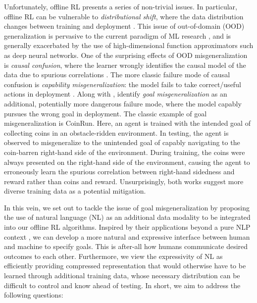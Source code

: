 \documentclass[../thesis-proposal/main.tex]{subfiles}
\begin{document}
Unfortunately, offline RL presents a series of non-trivial issues. In particular, offline RL can be
vulnerable to \textit{distributional shift}, where the data distribution changes between training
and deployment \citep{quinonero-candela_dataset_2008}. This issue of out-of-domain (OOD)
generalization \citep{shen_towards_2021} is pervasive to the current paradigm of ML research
\citep{arjovsky_out_2020}, and is generally exacerbated by the use of high-dimensional function
approximators such as deep neural networks. One of the surprising effects of OOD misgeneralization
is \textit{causal confusion}, where the learner wrongly identifies the causal model of the data due
to spurious correlations \citep{de_haan_causal_2019}. The more classic  failure mode of causal
confusion is \textit{capability misgeneralization}: the model fails to take correct/useful actions
in deployment \citep{gupta_can_2022, tien_study_2022}. Along with \citet{shah_goal_2022},
\citet{langosco_goal_2022} identify \textit{goal misgeneralization} as an additional, potentially
more dangerous failure mode, where the model capably pursues the wrong goal in deployment. The
classic example of goal misgeneralization is CoinRun. Here, an agent is trained with the intended
goal of collecting coins in an obstacle-ridden environment. In testing, the agent is observed to
misgeneralize to the unintended goal of capably navigating to the coin-barren right-hand side of the
environment. During training, the coins were always presented on the right-hand side of the
environment, causing the agent to erroneously learn the spurious correlation between right-hand
sidedness and reward rather than coins and reward. Unsurprisingly, both works suggest more diverse
training data as a potential mitigation.

In this vein, we set out to tackle the issue of goal misgeneralization by proposing the use of
natural language (NL) as an additional data modality to be integrated into our offline RL
algorithms. Inspired by their applications beyond a pure NLP context \citep{dosovitskiy_image_2022,
ramesh_hierarchical_2022, rombach_high-resolution_2022}, we can develop a more natural and
expressive interface between human and machine to specify goals. This is after-all how humans
communicate desired outcomes to each other. Furthermore, we view the expressivity of NL as
efficiently providing compressed representation that would otherwise have to be learned through
additional training data, whose necessary distribution can be difficult to control and know ahead of
testing. In short, we aim to address the following questions:
\end{document}
